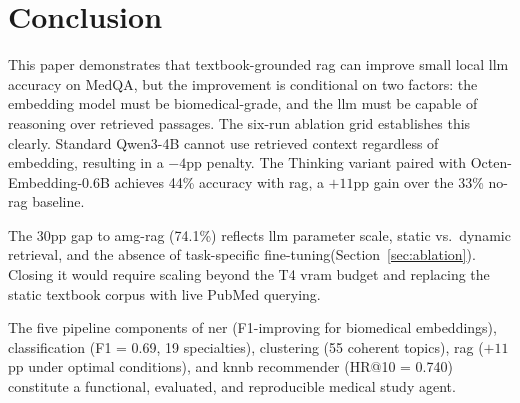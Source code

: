 \section{Conclusion}
\label{sec:conclusion}

This paper demonstrates that textbook-grounded \gls{rag} can improve small local \gls{llm} accuracy on MedQA, but the improvement is conditional on two factors: the embedding model must be biomedical-grade, and the \gls{llm} must be capable of reasoning over retrieved passages. The six-run ablation grid establishes this clearly. Standard Qwen3-4B cannot use retrieved context regardless of embedding, resulting in a $-4$\gls{pp} penalty. The Thinking variant paired with Octen-Embedding-0.6B achieves 44\% accuracy with \gls{rag}, a $+11$\gls{pp} gain over the 33\% no-\gls{rag} baseline.

The 30\gls{pp} gap to \gls{amg-rag} (74.1\%) reflects \gls{llm} parameter scale, static vs.\ dynamic retrieval, and the absence of task-specific fine-tuning(Section~\ref{sec:ablation}). Closing it would require scaling beyond the T4 \gls{vram} budget and replacing the static textbook corpus with live PubMed querying.

The five pipeline components of \gls{ner} (F1-improving for biomedical embeddings), classification (F1 = 0.69, 19 specialties), clustering (55 coherent topics), \gls{rag} ($+11$\gls{pp} under optimal conditions), and \gls{knnb} recommender (HR@10 = 0.740) constitute a functional, evaluated, and reproducible medical study agent.
